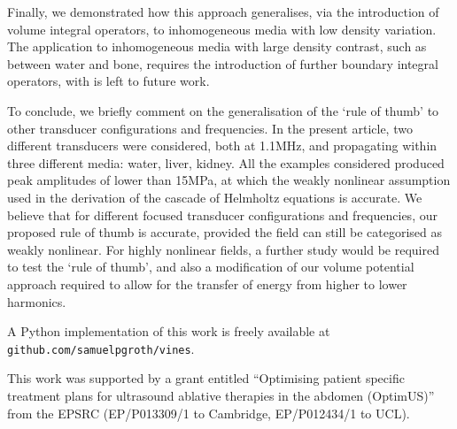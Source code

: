 \documentclass[preprint]{JASA}
\newcommand{\red}[1]{{\color{red} #1}}
\begin{document}
\red{Finally, we demonstrated how this approach generalises, via the introduction of volume integral operators,
 to inhomogeneous media with low density variation.
The application to inhomogeneous media with large density contrast, such as between 
water and bone, requires the introduction of further boundary integral operators, 
with is left to future work.}

\red{To conclude, we briefly comment on the generalisation of the `rule of thumb'
to other transducer configurations and frequencies. In the present article, two 
different transducers were considered, both at 1.1MHz, and propagating within 
three different media: water, liver, kidney. All the examples considered produced 
peak amplitudes of lower than 15MPa, at which the weakly nonlinear assumption used 
in the derivation of the cascade of Helmholtz equations is accurate. We believe that 
for different focused transducer configurations and frequencies, our proposed rule 
of thumb is accurate, provided the field can still be categorised as weakly nonlinear.
For highly nonlinear fields, a further study would be required to test the `rule of 
thumb', and also a modification of our volume potential approach required to allow for 
the transfer of energy from higher to lower harmonics.}


A Python implementation of this work is freely available at \verb!github.com/samuelpgroth/vines!.



\begin{acknowledgments}
This work was supported by a grant entitled 
``Optimising patient specific treatment plans for ultrasound ablative therapies in the abdomen (OptimUS)''
from the EPSRC (EP/P013309/1 to Cambridge, EP/P012434/1 to UCL).
\end{acknowledgments}





\end{document}
